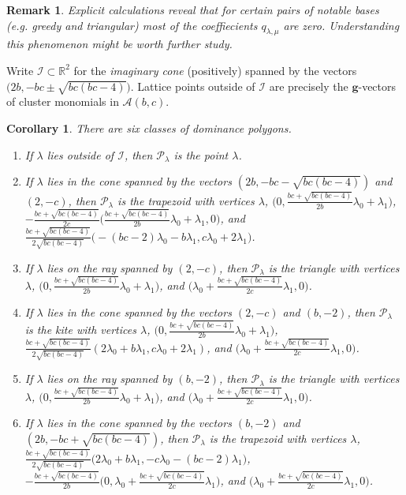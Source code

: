 \documentclass{amsart}
\newtheorem{corollary}[theorem]{Corollary}
\newtheorem{remark}[theorem]{Remark}
\numberwithin{theorem}{section}
\newcommand{\bfg}{\boldsymbol{g}}
\newcommand{\cA}{\mathcal{A}}
\newcommand{\cI}{\mathcal{I}}
\newcommand{\cP}{\mathcal{P}}
\newcommand{\RR}{\mathbb{R}}
\begin{document}
  \begin{remark}
    Explicit calculations reveal that for certain pairs of notable bases (e.g. greedy and triangular) most of the coeffiecients $q_{\lambda,\mu}$ are zero.
    Understanding this phenomenon might be worth further study.
  \end{remark}

  Write $\cI \subset \RR^2$ for the \emph{imaginary cone} (positively) spanned by the vectors $\big(2b,-bc\pm\sqrt{bc(bc-4)}\big)$.
  Lattice points outside of $\cI$ are precisely the $\bfg$-vectors of cluster monomials in $\cA(b,c)$.
  \begin{corollary}
    \label{cor:dominance vertices}
    There are six classes of dominance polygons.
    \begin{enumerate}
      \item If $\lambda$ lies outside of $\cI$, then $\cP_\lambda$ is the point $\lambda$. 
      \item If $\lambda$ lies in the cone spanned by the vectors $(2b,-bc-\sqrt{bc(bc-4)})$ and $(2,-c)$, then $\cP_\lambda$ is the trapezoid with  vertices $\lambda$, $\big(0,\frac{bc+\sqrt{bc(bc-4)}}{2b}\lambda_0+\lambda_1\big)$, $-\frac{bc+\sqrt{bc(bc-4)}}{2c}\big(\frac{bc+\sqrt{bc(bc-4)}}{2b}\lambda_0+\lambda_1,0\big)$, and ${\frac{bc+\sqrt{bc(bc-4)}}{2\sqrt{bc(bc-4)}}\big(-(bc-2)\lambda_0-b\lambda_1,c\lambda_0+2\lambda_1\big)}$.
      \item If $\lambda$ lies on the ray spanned by $(2,-c)$, then $\cP_\lambda$ is the triangle with vertices $\lambda$, $\big(0,\frac{bc+\sqrt{bc(bc-4)}}{2b}\lambda_0+\lambda_1\big)$, and $\big(\lambda_0+\frac{bc+\sqrt{bc(bc-4)}}{2c}\lambda_1,0\big)$.
      \item If $\lambda$ lies in the cone spanned by the vectors $(2,-c)$ and $(b,-2)$, then $\cP_\lambda$ is the kite with  vertices $\lambda$, $\big(0,\frac{bc+\sqrt{bc(bc-4)}}{2b}\lambda_0+\lambda_1\big)$, $\frac{bc+\sqrt{bc(bc-4)}}{2\sqrt{bc(bc-4)}}(2\lambda_0+b\lambda_1,c\lambda_0+2\lambda_1)$, and $\big(\lambda_0+\frac{bc+\sqrt{bc(bc-4)}}{2c}\lambda_1,0\big)$.
      \item If $\lambda$ lies on the ray spanned by $(b,-2)$, then $\cP_\lambda$ is the triangle with vertices $\lambda$, $\big(0,\frac{bc+\sqrt{bc(bc-4)}}{2b}\lambda_0+\lambda_1\big)$, and $\big(\lambda_0+\frac{bc+\sqrt{bc(bc-4)}}{2c}\lambda_1,0\big)$.
      \item If $\lambda$ lies in the cone spanned by the vectors $(b,-2)$ and $(2b,-bc+\sqrt{bc(bc-4)})$, then $\cP_\lambda$ is the trapezoid with vertices $\lambda$, $\frac{bc+\sqrt{bc(bc-4)}}{2\sqrt{bc(bc-4)}}\big(2\lambda_0+b\lambda_1,-c\lambda_0-(bc-2)\lambda_1\big)$, $-\frac{bc+\sqrt{bc(bc-4)}}{2b}\big(0,\lambda_0+\frac{bc+\sqrt{bc(bc-4)}}{2c}\lambda_1\big)$, and $\big(\lambda_0+\frac{bc+\sqrt{bc(bc-4)}}{2c}\lambda_1,0\big)$.
    \end{enumerate}
  \end{corollary}
\end{document}

